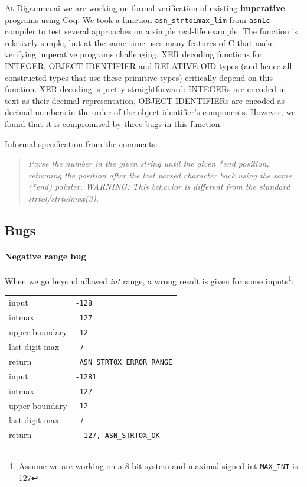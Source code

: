 \documentclass[acmsmall,nonacm]{acmart}
\begin{document}
  At \url{Digamma.ai} we are working on formal verification of existing {\bf imperative} programs using Coq. We took a function \texttt{asn\_strtoimax\_lim} from \texttt{asn1c} compiler to test several approaches on a simple real-life example. The function is relatively simple, but at the same time uses many features of C that make verifying imperative programs challenging. XER decoding functions for INTEGER, OBJECT-IDENTIFIER and RELATIVE-OID types (and hence all constructed types that use these primitive types) critically depend on this function. XER decoding is pretty straightforward: INTEGERs are encoded in text as their decimal representation, OBJECT IDENTIFIERs are encoded as decimal numbers in the order of the object identifier's components. However, we found that it is compromised by three bugs in this function.
  
    Informal specification from the comments: 
  \begin{quote}

 { \it Parse the number in the given string until the given *end position,
 returning the position after the last parsed character back using the
 same (*end) pointer.
 WARNING: This behavior is different from the standard strtol/strtoimax(3). }
\end{quote}



\subsection{Bugs}

  
  
\paragraph{Negative range bug}

When we go beyond allowed \textit{int} range, a wrong result is given for some inputs\footnote{Assume we are working on a 8-bit system and maximal signed int \texttt{MAX\_INT} is 127}:

\begin{tabular}{|l|l|}
 \hline
input & \texttt{-128} \\
intmax & \texttt{\ 127}\\
upper boundary& \texttt{\ 12} \\
last digit max& \texttt{\ 7}\\
return & \color{green}\texttt{\ ASN\_STRTOX\_ERROR\_RANGE}\\
\hline 
input & \texttt{-1281} \\
intmax & \texttt{\ 127}\\
upper boundary& \texttt{\ 12} \\
last digit max& \texttt{\ 7}\\
return & \color{red}\texttt{\ -127, ASN\_STRTOX\_OK}\\
\hline
    \end{tabular}
\end{document}
